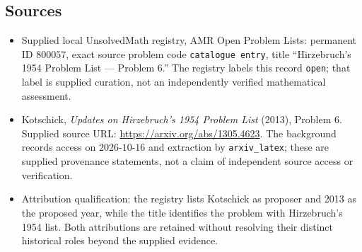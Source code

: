\documentclass[11pt]{article}
\begin{document}
\subsection{Sources}
\begin{itemize}
\item Supplied local UnsolvedMath registry, AMR Open Problem Lists: permanent ID \(800057\), exact source problem code \texttt{catalogue entry}, title ``Hirzebruch's 1954 Problem List --- Problem 6.'' The registry labels this record \texttt{open}; that label is supplied curation, not an independently verified mathematical assessment.
\item Kotschick, \emph{Updates on Hirzebruch's 1954 Problem List} (2013), Problem 6. Supplied source URL: \url{https://arxiv.org/abs/1305.4623}. The background records access on \(2026\text{-}10\text{-}16\) and extraction by \texttt{arxiv\_latex}; these are supplied provenance statements, not a claim of independent source access or verification.
\item Attribution qualification: the registry lists Kotschick as proposer and 2013 as the proposed year, while the title identifies the problem with Hirzebruch's 1954 list. Both attributions are retained without resolving their distinct historical roles beyond the supplied evidence.
\end{itemize}
\end{document}
